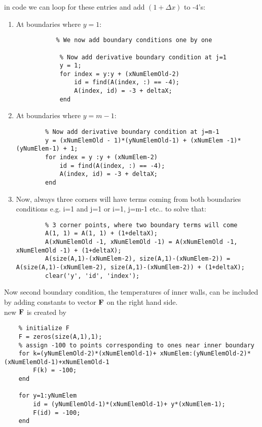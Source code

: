 \documentclass{article}
\begin{document}
in code we can loop for these entries and add $(1 + \Delta x)$ to -4's:\\
\begin{enumerate}
    \item At boundaries where $y = 1$:\\
    \begin{lstlisting}
           % We now add boundary conditions one by one

            % Now add derivative boundary condition at j=1
            y = 1;
            for index = y:y + (xNumElemOld-2)
                id = find(A(index, :) == -4);
                A(index, id) = -3 + deltaX;
            end
    \end{lstlisting}
    \item At boundaries where $y = m-1$:\\
    \begin{lstlisting}
        % Now add derivative boundary condition at j=m-1
        y = (xNumElemOld - 1)*(yNumElemOld-1) + (xNumElem -1)*(yNumElem-1) + 1;
        for index = y :y + (xNumElem-2)
            id = find(A(index, :) == -4);
            A(index, id) = -3 + deltaX;
        end
    \end{lstlisting}
    \item Now, always three corners will have terms coming from both boundaries conditions e.g. i=1 and j=1 or i=1, j=m-1 etc.. to solve that:\\
    \begin{lstlisting}
        % 3 corner points, where two boundary terms will come
        A(1, 1) = A(1, 1) + (1+deltaX);
        A(xNumElemOld -1, xNumElemOld -1) = A(xNumElemOld -1, xNumElemOld -1) + (1+deltaX);
        A(size(A,1)-(xNumElem-2), size(A,1)-(xNumElem-2)) = A(size(A,1)-(xNumElem-2), size(A,1)-(xNumElem-2)) + (1+deltaX);
        clear('y', 'id', 'index');
    \end{lstlisting}
\end{enumerate}
\newpage
Now second boundary condition, the temperatures of inner walls, can be included by adding constants to vector $\bf{F}$ on the right hand side.\\
new $\bf{F}$ is created by
\begin{lstlisting}
    % initialize F
    F = zeros(size(A,1),1);
    % assign -100 to points corresponding to ones near inner boundary
    for k=(yNumElemOld-2)*(xNumElemOld-1)+ xNumElem:(yNumElemOld-2)*(xNumElemOld-1)+xNumElemOld-1
        F(k) = -100;
    end

    for y=1:yNumElem
        id = (yNumElemOld-1)*(xNumElemOld-1)+ y*(xNumElem-1);
        F(id) = -100;
    end

\end{lstlisting}
\end{document}
